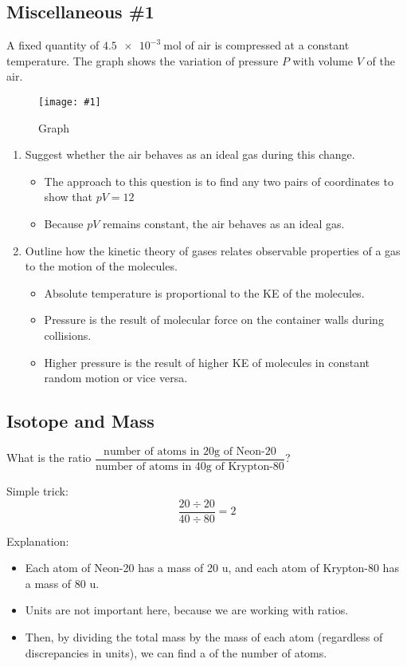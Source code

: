 \documentclass[a4paper,12pt]{article}
\newcommand{\img}[4]{\begin{center}
  \begin{figure}[H]
    \centering
    \texttt{[image: \#1]}
    \caption{#3}
    \label{fig:#4}
  \end{figure}
\end{center}}
\begin{document}
\subsection{Miscellaneous \#1}

A fixed quantity of $\SI{4.5e-3}{\mole}$ of  air is compressed at a constant temperature. The graph shows the variation of pressure $P$ with volume $V$ of the air.

\img{ex/2.png}{0.7}{Graph}{misc1}

\begin{enumerate}[label=(\alph*)]
  \item Suggest whether the air behaves as an ideal gas during this change.
        \begin{itemize}
          \item The approach to this question is to find any two pairs of coordinates to show that $pV = 12$
          \item Because $pV$ remains constant, the air behaves as an ideal gas.
        \end{itemize}
  \item Outline how the kinetic theory of gases relates observable properties of a gas to the motion of the molecules.
        \begin{itemize}
          \item Absolute temperature is proportional to the KE of the molecules.
          \item Pressure is the result of molecular force on the container walls during collisions.
          \item Higher pressure is the result of higher KE of molecules in constant random motion or vice versa.
        \end{itemize}
\end{enumerate}

\pagebreak

\subsection{Isotope and Mass}

What is the ratio $\dfrac{\text{number of atoms in 20g of Neon-20}}{\text{number of atoms in 40g of Krypton-80}}$?

Simple trick: $$\frac{20 \div 20}{40\div 80} = 2$$

Explanation:
\begin{itemize}
  \item Each atom of Neon-20 has a mass of 20 u, and each atom of Krypton-80 has a mass of 80 u.
  \item Units are not important here, because we are working with ratios.
  \item Then, by dividing the total mass by the mass of each atom (regardless of discrepancies in units), we can find a  of the number of atoms.
\end{itemize}
\end{document}
